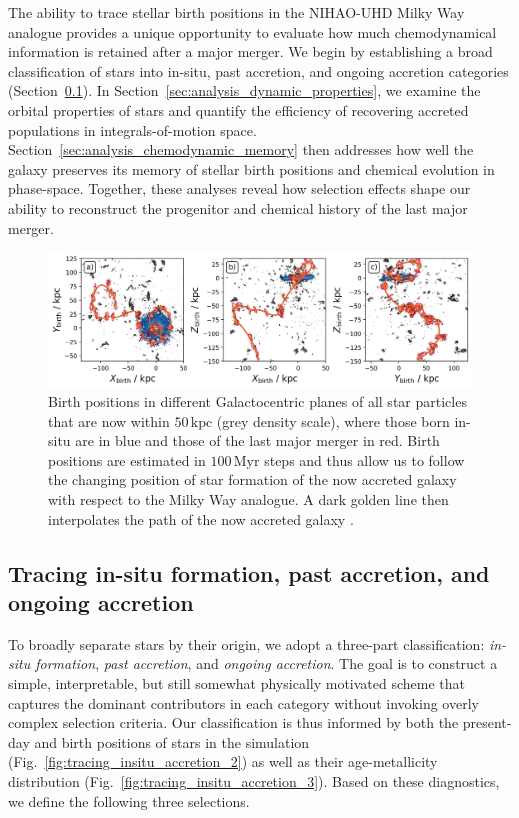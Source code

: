 \documentclass[fleqn,usenatbib]{mnras}
\begin{document}
The ability to trace stellar birth positions in the NIHAO-UHD Milky Way analogue provides a unique opportunity to evaluate how much chemodynamical information is retained after a major merger. We begin by establishing a broad classification of stars into in-situ, past accretion, and ongoing accretion categories (Section~\ref{sec:analysis_broad_selection}). In Section~\ref{sec:analysis_dynamic_properties}, we examine the orbital properties of stars and quantify the efficiency of recovering accreted populations in integrals-of-motion space. Section~\ref{sec:analysis_chemodynamic_memory} then addresses how well the galaxy preserves its memory of stellar birth positions and chemical evolution in phase-space. Together, these analyses reveal how selection effects shape our ability to reconstruct the progenitor and chemical history of the last major merger.

\begin{figure}
    \centering
    \includegraphics[width=\textwidth]{figures/tracing_xyz_birth_3.png}
    \caption{Birth positions in different Galactocentric planes of all star particles that are now within $50\,\mathrm{kpc}$ (grey density scale), where those born in-situ are in blue and those of the last major merger in red. Birth positions are estimated in $100\,\mathrm{Myr}$ steps and thus allow us to follow the changing position of star formation of the now accreted galaxy with respect to the Milky Way analogue. A dark golden line then interpolates the path of the now accreted galaxy \href{https://github.com/svenbuder/gse_nihaouhd/tree/main/figures}{\faGithub}.}
    \label{fig:tracing_xyz_birth_3}
\end{figure}

\subsection{Tracing in-situ formation, past accretion, and ongoing accretion} \label{sec:analysis_broad_selection}

To broadly separate stars by their origin, we adopt a three-part classification: \textit{in-situ formation}, \textit{past accretion}, and \textit{ongoing accretion}. The goal is to construct a simple, interpretable, but still somewhat physically motivated scheme that captures the dominant contributors in each category without invoking overly complex selection criteria. Our classification is thus informed by both the present-day and birth positions of stars in the simulation (Fig.~\ref{fig:tracing_insitu_accretion_2}) as well as their age-metallicity distribution (Fig.~\ref{fig:tracing_insitu_accretion_3}). Based on these diagnostics, we define the following three selections.
\end{document}
